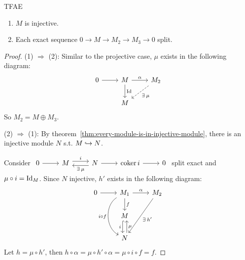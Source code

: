 \begin{prop}
  TFAE
  \begin{enumerate}
    \item $M$ is injective.
    \item Each exact sequence $0 \to M \to M_2 \to M_3 \to 0$ split.
  \end{enumerate}
  \begin{proof}
    (1) $\Rightarrow$ (2): Similar to the projective case, $\mu$ exists
    in the following diagram:
    \[
    \begin{tikzcd}
      0 \ar[r] & M \ar[r, "\alpha"] \ar[d, "\Id"] & M_2 \ar[dl, "\exists
      \mu", dashed] \\
               & M
    \end{tikzcd}
    \]
    So $M_2 = M \oplus M_3$.

    (2) $\Rightarrow$ (1):
    By theorem~\ref{thm:every-module-is-in-injective-module},
    there is an injective module $N$ s.t. $M \hookrightarrow N$.

    Consider
    $
    \begin{tikzcd}
    0 \ar[r] & M \ar[r, "i", yshift=0.7ex] &  N \ar[r] \ar[l, "\exists \mu", 
      yshift=-0.7ex] & \coker i \ar[r]& 0
    \end{tikzcd}
    $
    split exact and $\mu \circ i = {\rm Id}_M$. Since $N$ injective,
    $h'$ exists in the following diagram:
    \[
    \begin{tikzcd}
      0 \ar[r] & M_1 \ar[r, "\alpha"] \ar[d , "f"] \ar[dd, "i 
      \circ f" swap, bend right = 60] & M_2 \ar[ddl, "\exists h'"]\\
               & M \ar[d, xshift=-0.7ex, "i" swap , hook] \\
               & N \ar[u, xshift=0.7ex, "\mu" swap]
    \end{tikzcd}
    \]
    Let $h = \mu \circ h'$, then $h \circ \alpha = \mu \circ h' 
    \circ \alpha = \mu \circ i \circ f = f$.
  \end{proof}
\end{prop}

